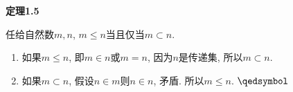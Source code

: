 \documentclass[UTF8]{ctexart}
\begin{document}
\vspace{10pt}

\hypertarget{sec:定理1.5}{}
\noindent\textbf{定理1.5}

任给自然数$m,n$, $m\leqslant n$当且仅当$m\subset n$.


\begin{enumerate}
    \item 如果$m\leqslant n$, 即$m\in n$或$m=n$, 因为$n$是传递集, 所以$m\subset n$.
    \item 如果$m\subset n$, 假设$n\in m$则$n\in n$, 矛盾. 所以$m\leqslant n$.
    \hfill $\qedsymbol$
\end{enumerate}
\end{document}
